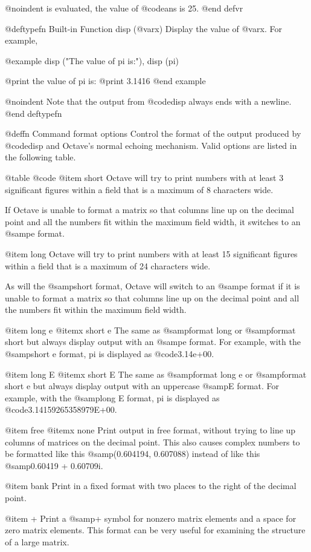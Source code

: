 @noindent
is evaluated, the value of @code{ans} is 25.
@end defvr

@deftypefn {Built-in Function} {} disp (@var{x})
Display the value of @var{x}.  For example,

@example
disp ("The value of pi is:"), disp (pi)

     @print{} the value of pi is:
     @print{} 3.1416
@end example

@noindent
Note that the output from @code{disp} always ends with a newline.
@end deftypefn

@deffn {Command} format options
Control the format of the output produced by @code{disp} and Octave's
normal echoing mechanism.  Valid options are listed in the following
table.

@table @code
@item short
Octave will try to print numbers with at least 3 significant figures
within a field that is a maximum of 8 characters wide.

If Octave is unable to format a matrix so that columns line up on the
decimal point and all the numbers fit within the maximum field width,
it switches to an @samp{e} format.

@item long
Octave will try to print numbers with at least 15 significant figures
within a field that is a maximum of 24 characters wide.

As will the @samp{short} format, Octave will switch to an @samp{e}
format if it is unable to format a matrix so that columns line up on the
decimal point and all the numbers fit within the maximum field width.

@item long e
@itemx short e
The same as @samp{format long} or @samp{format short} but always display
output with an @samp{e} format.  For example, with the @samp{short e}
format, pi is displayed as @code{3.14e+00}.

@item long E
@itemx short E
The same as @samp{format long e} or @samp{format short e} but always
display output with an uppercase @samp{E} format.  For example, with
the @samp{long E} format, pi is displayed as
@code{3.14159265358979E+00}.

@item free
@itemx none
Print output in free format, without trying to line up columns of
matrices on the decimal point.  This also causes complex numbers to be
formatted like this @samp{(0.604194, 0.607088)} instead of like this
@samp{0.60419 + 0.60709i}.

@item bank
Print in a fixed format with two places to the right of the decimal
point.

@item +
Print a @samp{+} symbol for nonzero matrix elements and a space for zero
matrix elements.  This format can be very useful for examining the
structure of a large matrix.

